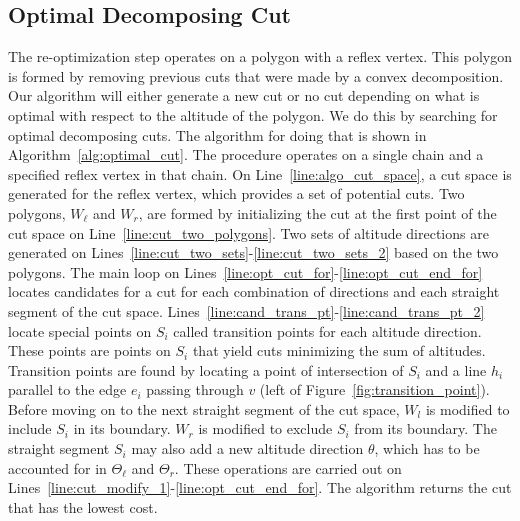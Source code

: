\documentclass[../main.tex]{subfiles}
\begin{document}
\subsection{Optimal Decomposing Cut}
\label{sec:alt_cut_decomposition}

The re-optimization step operates on a polygon with a reflex vertex. This polygon is formed by removing previous cuts that were made by a convex decomposition. Our algorithm will either generate a new cut or no cut depending on what is optimal with respect to the altitude of the polygon. We do this by searching for optimal decomposing cuts. The algorithm for doing that is shown in Algorithm~\ref{alg:optimal_cut}. The procedure operates on a single chain and a specified reflex vertex in that chain. On Line~\ref{line:algo_cut_space}, a cut space is generated for the reflex vertex, which provides a set of potential cuts. Two polygons, $W_{\ell}$ and $W_r$, are formed by initializing the cut at the first point of the cut space on Line~\ref{line:cut_two_polygons}. Two sets of altitude directions are generated on Lines~\ref{line:cut_two_sets}-\ref{line:cut_two_sets_2} based on the two polygons. The main loop on Lines~\ref{line:opt_cut_for}-\ref{line:opt_cut_end_for} locates candidates for a cut for each combination of directions and each straight segment of the cut space. Lines~\ref{line:cand_trans_pt}-\ref{line:cand_trans_pt_2} locate special points on $S_i$ called transition points for each altitude direction. These points are points on $S_i$ that yield cuts minimizing the sum of altitudes. Transition points are found by locating a point of intersection of $S_i$ and a line $h_i$ parallel to the edge $e_i$ passing through $v$ (left of Figure~\ref{fig:transition_point}). Before moving on to the next straight segment of the cut space, $W_l$ is modified to include $S_i$ in its boundary. $W_r$ is modified to exclude $S_i$ from its boundary. The straight segment $S_i$ may also add a new altitude direction $\theta$, which has to be accounted for in $\Theta_{\ell}$ and $\Theta_r$. These operations are carried out on Lines~\ref{line:cut_modify_1}-\ref{line:opt_cut_end_for}. The algorithm returns the cut that has the lowest cost.
\end{document}
